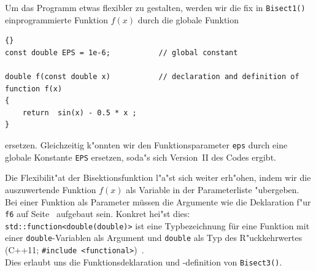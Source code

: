 

Um das Programm etwas flexibler zu gestalten, werden wir die fix
in \verb|Bisect1()| einprogrammierte Funktion $f(x)$ durch die
globale Funktion

\begin{lstlisting}[caption=Globale Funktion und globale Konstante,label=lst:7_9_2,basicstyle=\scriptsize]{}
const double EPS = 1e-6;           // global constant

double f(const double x)           // declaration and definition of function f(x)
{
    return  sin(x) - 0.5 * x ;
}
\end{lstlisting}


ersetzen.
Gleichzeitig k"onnten wir den Funktionsparameter \verb|eps| durch eine globale
Konstante \verb|EPS| ersetzen, soda"s sich Version~II des Codes ergibt.

Die Flexibilit"at der Bisektionsfunktion l"a"st sich weiter erh"ohen, 
indem wir die auszuwertende Funktion $f(x)$ als Variable in der
Parameterliste "ubergeben. Bei einer Funktion als Parameter müssen die Argumente 
wie die Deklaration f"ur \verb|f6| auf Seite~\pageref{fkt:f6} aufgebaut sein.
Konkret hei"st dies:
\\[0.5ex]
\verb|std::function<double(double)>| ist eine Typbezeichnung für eine
Funktion mit einer \verb|double|-Variablen als Argument
und \verb|double| als Typ des R"uckkehrwertes (C++11; \verb|#include <functional>|)~\cite[\S23.3.1]{Will:2018:CPT}.
\\[0.5ex]
Dies erlaubt uns die Funktionsdeklaration und -definition von
\verb|Bisect3()|.
%

